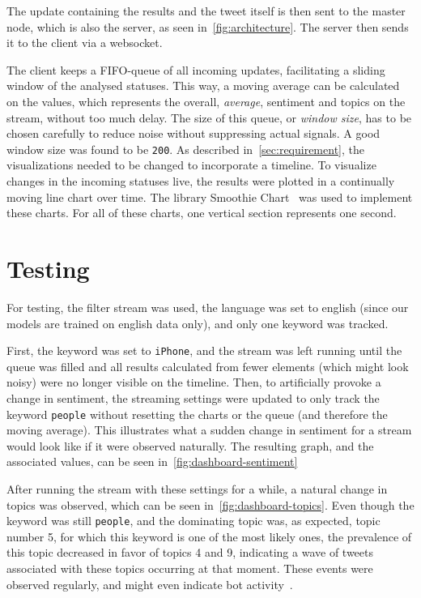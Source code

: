 The update containing the results and the tweet itself is then sent to the master node,
which is also the server, as seen in~\cref{fig:architecture}.
The server then sends it to the client via a websocket.

The client keeps a FIFO-queue of all incoming updates, facilitating a sliding window of the analysed statuses.
This way, a moving average can be calculated on the values, which represents the overall, \textit{average},
sentiment and topics on the stream, without too much delay.
The size of this queue, or \textit{window size}, has to be chosen carefully to reduce noise without suppressing actual signals.
A good window size was found to be \texttt{200}.
As described in~\cref{sec:requirement}, the visualizations needed to be changed to incorporate a timeline.
To visualize changes in the incoming statuses live, the results were plotted in a continually moving line chart over time.
The library Smoothie Chart~\cite{smoothieDocs} was used to implement these charts.
For all of these charts, one vertical section represents one second.

\section{Testing}
\label{sec:testing}

For testing, the filter stream was used,
the language was set to english (since our models are trained on english data only),
and only one keyword was tracked.

First, the keyword was set to \texttt{iPhone},
and the stream was left running until the queue was filled and all results calculated from fewer elements
(which might look noisy) were no longer visible on the timeline.
Then, to artificially provoke a change in sentiment,
the streaming settings were updated to only track the keyword \texttt{people} without resetting the charts or the queue (and therefore the moving average).
This illustrates what a sudden change in sentiment for a stream would look like if it were observed naturally.
The resulting graph, and the associated values, can be seen in~\cref{fig:dashboard-sentiment}

After running the stream with these settings for a while, a natural change in topics was observed, which can be seen in~\cref{fig:dashboard-topics}.
Even though the keyword was still \texttt{people}, and the dominating topic was, as expected, topic number 5,
for which this keyword is one of the most likely ones, the prevalence of this topic decreased in favor of topics 4 and 9,
indicating a wave of tweets associated with these topics occurring at that moment.
These events were observed regularly, and might even indicate bot activity~\cite{chu2012detecting}.

